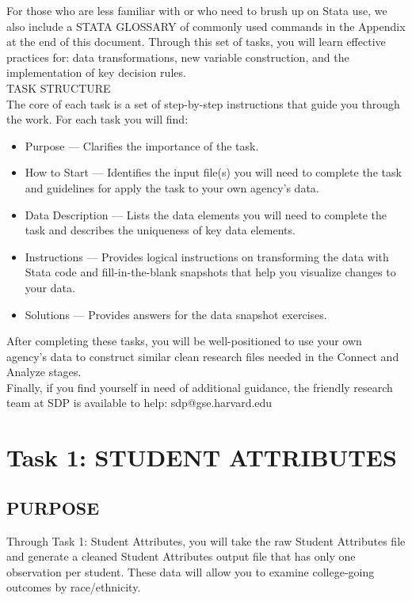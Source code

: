 \documentclass[12pt]{article}
\begin{document}
For those who are less familiar with or who need to brush up on Stata use, we also include a STATA GLOSSARY of 
commonly used commands in the Appendix at the end of this document.  Through this set of tasks, you will learn effective practices 
for: data transformations, new variable construction, and the implementation of key decision rules.\\

\noindent\large{TASK STRUCTURE} \\
\normalsize
The core of each task is a set of step-by-step instructions that guide you through the work. For each task you will find:
\begin{itemize}
\item Purpose --- Clarifies the importance of the task.  
\item How to Start --- Identifies the input file(s) you will need to complete the task and guidelines for apply the task to your  own agency's data.
\item Data Description --- Lists the data elements you will need to complete the task and describes the uniqueness of key data elements.
\item Instructions --- Provides logical instructions on transforming the data with Stata code and fill-in-the-blank snapshots that help you visualize changes to your data.
\item Solutions --- Provides answers for the data snapshot exercises.
\end{itemize}

\noindent After completing these tasks, you will be well-positioned to use your own agency’s data to construct similar clean research files needed in the Connect and Analyze stages.\\

\noindent Finally, if you find yourself in need of additional guidance, the friendly research team at SDP is available to help: sdp@gse.harvard.edu


\section{Task 1: STUDENT ATTRIBUTES}
\subsection{PURPOSE}

\normalsize Through Task 1: Student Attributes, you will take the raw Student Attributes file and generate a cleaned Student Attributes output 
file that has only one observation per student. These data will allow you to examine college-going outcomes by race/ethnicity.\\
\end{document}
